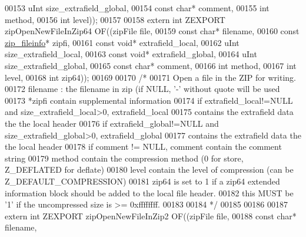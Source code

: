 \begin{DoxyCode}
00153                        uInt size\_extrafield\_global,
00154                        \textcolor{keyword}{const} \textcolor{keywordtype}{char}* comment,
00155                        \textcolor{keywordtype}{int} method,
00156                        \textcolor{keywordtype}{int} level));
00157 
00158 \textcolor{keyword}{extern} \textcolor{keywordtype}{int} ZEXPORT zipOpenNewFileInZip64 OF((zipFile file,
00159                        \textcolor{keyword}{const} \textcolor{keywordtype}{char}* filename,
00160                        \textcolor{keyword}{const} \hyperlink{structzip__fileinfo}{zip\_fileinfo}* zipfi,
00161                        \textcolor{keyword}{const} \textcolor{keywordtype}{void}* extrafield\_local,
00162                        uInt size\_extrafield\_local,
00163                        \textcolor{keyword}{const} \textcolor{keywordtype}{void}* extrafield\_global,
00164                        uInt size\_extrafield\_global,
00165                        \textcolor{keyword}{const} \textcolor{keywordtype}{char}* comment,
00166                        \textcolor{keywordtype}{int} method,
00167                        \textcolor{keywordtype}{int} level,
00168                        \textcolor{keywordtype}{int} zip64));
00169 
00170 \textcolor{comment}{/*}
00171 \textcolor{comment}{  Open a file in the ZIP for writing.}
00172 \textcolor{comment}{  filename : the filename in zip (if NULL, '-' without quote will be used}
00173 \textcolor{comment}{  *zipfi contain supplemental information}
00174 \textcolor{comment}{  if extrafield\_local!=NULL and size\_extrafield\_local>0, extrafield\_local}
00175 \textcolor{comment}{    contains the extrafield data the the local header}
00176 \textcolor{comment}{  if extrafield\_global!=NULL and size\_extrafield\_global>0, extrafield\_global}
00177 \textcolor{comment}{    contains the extrafield data the the local header}
00178 \textcolor{comment}{  if comment != NULL, comment contain the comment string}
00179 \textcolor{comment}{  method contain the compression method (0 for store, Z\_DEFLATED for deflate)}
00180 \textcolor{comment}{  level contain the level of compression (can be Z\_DEFAULT\_COMPRESSION)}
00181 \textcolor{comment}{  zip64 is set to 1 if a zip64 extended information block should be added to the local file header.}
00182 \textcolor{comment}{                    this MUST be '1' if the uncompressed size is >= 0xffffffff.}
00183 \textcolor{comment}{}
00184 \textcolor{comment}{*/}
00185 
00186 
00187 \textcolor{keyword}{extern} \textcolor{keywordtype}{int} ZEXPORT zipOpenNewFileInZip2 OF((zipFile file,
00188                                             \textcolor{keyword}{const} \textcolor{keywordtype}{char}* filename,

\end{DoxyCode}
